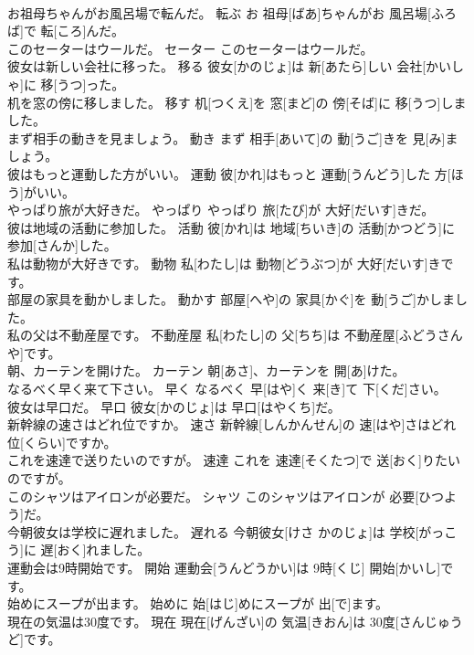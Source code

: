 \documentclass[8pt]{extreport}
\begin{document}
\begin{CJK}{UTF8}{min}
\\	お祖母ちゃんがお風呂場で転んだ。	転ぶ	お 祖母[ばあ]ちゃんがお 風呂場[ふろば]で 転[ころ]んだ。	
\\	このセーターはウールだ。	セーター	このセーターはウールだ。	
\\	彼女は新しい会社に移った。	移る	彼女[かのじょ]は 新[あたら]しい 会社[かいしゃ]に 移[うつ]った。	
\\	机を窓の傍に移しました。	移す	机[つくえ]を 窓[まど]の 傍[そば]に 移[うつ]しました。	
\\	まず相手の動きを見ましょう。	動き	まず 相手[あいて]の 動[うご]きを 見[み]ましょう。	
\\	彼はもっと運動した方がいい。	運動	彼[かれ]はもっと 運動[うんどう]した 方[ほう]がいい。	
\\	やっぱり旅が大好きだ。	やっぱり	やっぱり 旅[たび]が 大好[だいす]きだ。	
\\	彼は地域の活動に参加した。	活動	彼[かれ]は 地域[ちいき]の 活動[かつどう]に 参加[さんか]した。	
\\	私は動物が大好きです。	動物	私[わたし]は 動物[どうぶつ]が 大好[だいす]きです。	
\\	部屋の家具を動かしました。	動かす	部屋[へや]の 家具[かぐ]を 動[うご]かしました。	
\\	私の父は不動産屋です。	不動産屋	私[わたし]の 父[ちち]は 不動産屋[ふどうさんや]です。	
\\	朝、カーテンを開けた。	カーテン	朝[あさ]、カーテンを 開[あ]けた。	
\\	なるべく早く来て下さい。	早く	なるべく 早[はや]く 来[き]て 下[くだ]さい。	
\\	彼女は早口だ。	早口	彼女[かのじょ]は 早口[はやくち]だ。	
\\	新幹線の速さはどれ位ですか。	速さ	新幹線[しんかんせん]の 速[はや]さはどれ 位[くらい]ですか。	
\\	これを速達で送りたいのですが。	速達	これを 速達[そくたつ]で 送[おく]りたいのですが。	
\\	このシャツはアイロンが必要だ。	シャツ	このシャツはアイロンが 必要[ひつよう]だ。	
\\	今朝彼女は学校に遅れました。	遅れる	今朝彼女[けさ かのじょ]は 学校[がっこう]に 遅[おく]れました。	
\\	運動会は9時開始です。	開始	運動会[うんどうかい]は 9時[くじ] 開始[かいし]です。	
\\	始めにスープが出ます。	始めに	始[はじ]めにスープが 出[で]ます。	
\\	現在の気温は30度です。	現在	現在[げんざい]の 気温[きおん]は 30度[さんじゅうど]です。	

\end{CJK}
\end{document}
